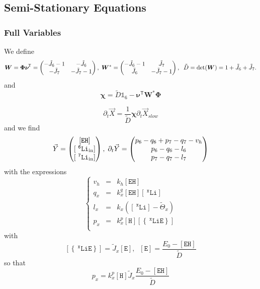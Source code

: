 \documentclass[aps,onecolumn,12pt]{revtex4}
\newcommand{\mychem}[1]{\mathtt{#1}}
\newcommand{\myconc}[1]{\left\lbrack{#1}\right\rbrack}
\newcommand{\spLi}[1]{{~^{\mychem{#1}}\mychem{Li}}}
\newcommand{\Li}[1]{\myconc{\spLi{#1}}}
\newcommand{\spEout}{\mychem{E}}
\newcommand{\Eout}{\myconc{\spEout}}
\newcommand{\spLiE}[1]{\left\lbrace\spLi{#1}\spEout\right\rbrace}
\newcommand{\LiE}[1]{\myconc{\spLiE{#1}}}
\newcommand{\spLiIn}[1]{{\spLi{#1}}_{\mathrm{in}}}
\newcommand{\LiIn}[1]{\myconc{\spLiIn{#1}}}
\newcommand{\spEHin}{\mychem{EH}}
\newcommand{\EHin}{\myconc{\spEHin}}
\newcommand{\spproton}{\mychem{H}}
\newcommand{\proton}{\myconc{\spproton}}
\newcommand{\mytrn}[1]{{#1}^{\!\mathsf{T}}}
\newcommand{\mymat}[1]{{\bm{#1}}}
\begin{document}
\subsection{Semi-Stationary Equations}
\subsubsection{Full Variables}
We define
\begin{equation}
	\mymat{W} = \mymat{\Phi}\mytrn{\mymat{\nu}} = \begin{pmatrix} -\tilde{J}_6-1 & -\tilde{J}_6 \cr -\tilde{J}_7 & -\tilde{J}_7-1\end{pmatrix}
	,\;\mymat{W}^\ast = \begin{pmatrix} -\tilde{J}_6-1 & \tilde{J}_7 \cr \tilde{J}_6 & -\tilde{J}_7-1\end{pmatrix}
	,\;\; \tilde{D} =\det(\mymat{W})=1+\tilde{J}_6+\tilde{J}_7.
\end{equation}
and
\begin{equation}
	\mymat{\chi} = \tilde{D}\mathds{1}_6-\mytrn{\mymat{\nu}}\mymat{W}^\ast\mymat{\Phi}
\end{equation}

\begin{equation}
	\partial_t\vec{X} = \dfrac{1}{\tilde{D}}
	\mymat{\chi} \partial_t\vec{X}_{slow}
\end{equation}
and we find
\begin{equation}
	\vec{Y} = \begin{pmatrix} \EHin \cr \LiIn{6} \cr \LiIn{7} \end{pmatrix}
	,\;\partial_t \vec{Y} = 
	\begin{pmatrix}
	p_6-q_6+p_7-q_7-v_h\\
	p_6-q_6-l_6\\
	p_7-q_7-l_7
	\end{pmatrix}
\end{equation}
with the expressions
\begin{equation}
\left\lbrace
	\begin{array}{rcl}
	v_h & = & k_h \EHin \\
	q_x & = & k_x^q \EHin \Li{x}  \\
	l_x & = & k_x  \left(\Li{x}- \tilde{\Theta}_x\right)\\
	p_x & = & k_x^p \proton \LiE{x}\\
	\end{array}
\right.
\end{equation}
with
\begin{equation}
	\LiE{x} = \tilde{J}_x \Eout,\;\;\Eout=\dfrac{E_0-\EHin}{\tilde{D}}
\end{equation}
so that
\begin{equation}
	p_x = k_x^p \proton  \tilde{J}_x \dfrac{E_0-\EHin}{\tilde{D}}
\end{equation}
\end{document}
